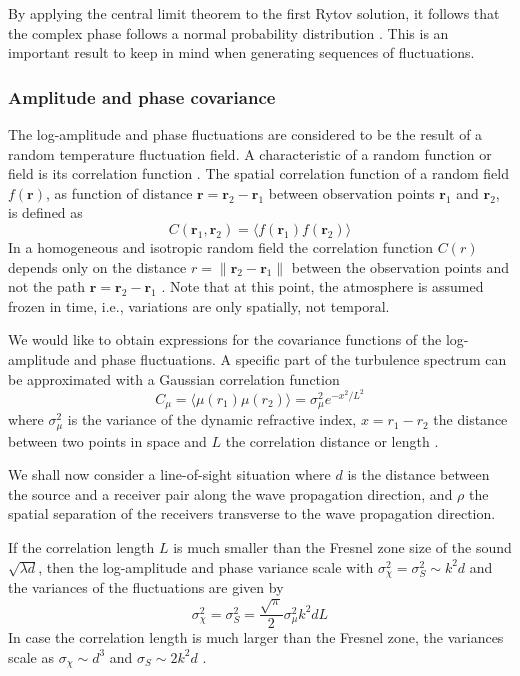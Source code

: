 By applying the central limit theorem to the first Rytov solution, it follows
that the complex phase follows a normal probability distribution
\cite{Jurado-navas2006}. This is an important result to keep in mind when
generating sequences of fluctuations.

\subsubsection*{Amplitude and phase covariance}
The log-amplitude and phase fluctuations are considered to be the result of a
random temperature fluctuation field. A characteristic of a random function or
field is its correlation function \cite{Tatarskii1971}. The spatial correlation
function of a random field $f(\mathbf{r})$, as function of distance $\mathbf{r}=\mathbf{r}_2-\mathbf{r}_1$
between observation points $\mathbf{r}_1$ and $\mathbf{r}_2$, is defined as
\begin{equation}
 C(\mathbf{r}_1, \mathbf{r}_2) = \langle f(\mathbf{r}_1)  f(\mathbf{r}_2) \rangle
\end{equation}
In a homogeneous and isotropic random field the correlation function $C(r)$
depends only on the distance $r = \lVert \mathbf{r}_2-\mathbf{r}_1 \rVert$
between the observation points and not the path
$\mathbf{r}=\mathbf{r}_2-\mathbf{r}_1$ \cite{Salomons2001}. Note that at this
point, the atmosphere is assumed frozen in time, i.e., variations are only
spatially, not temporal.

We would like to obtain expressions for the covariance functions of the
log-amplitude and phase fluctuations. A specific part of the turbulence spectrum
can be approximated with a Gaussian correlation function
\begin{equation}
 C_{\mu} = \langle \mu(r_1) \mu(r_2) \rangle = \sigma_{\mu}^2 e^{-x^2/L^2}
\end{equation}
where $\sigma_{\mu}^2$ is the variance of the dynamic refractive index,
$x=r_1-r_2$ the distance between two points in space and $L$ the correlation
distance or length \cite{Ishimaru1997}.

We shall now consider a line-of-sight situation where $d$ is the
distance between the source and a receiver pair along the wave propagation
direction, and $\rho$ the spatial separation of the receivers transverse to the
wave propagation direction.

If the correlation length $L$ is much smaller than the Fresnel zone size of the sound
$\sqrt{\lambda d}$, then the log-amplitude and phase variance scale with
$\sigma_{\chi}^2=\sigma_{S}^2 \sim k^2 d$
\cite{Ishimaru1997} and the variances of the fluctuations are given by \cite{Daigle1983}
\begin{equation}\label{eq:model_daigle}
 \sigma_{\chi}^2 = \sigma_{S}^2 = \frac{\sqrt{\pi}}{2} \sigma_{\mu}^2 k^2 d L
\end{equation}
In case the correlation length is much larger than the Fresnel zone, the variances
scale as $\sigma_{\chi} \sim d^3$ and $\sigma_{S} \sim 2 k^2 d$ \cite{Ishimaru1997}.

